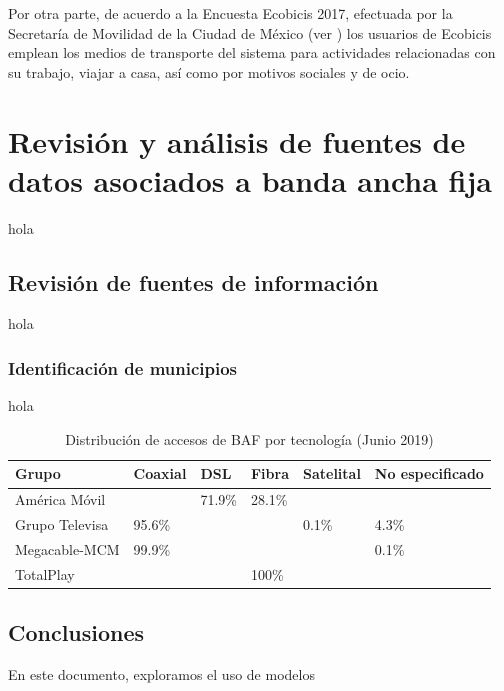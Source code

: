 \documentclass[9pt,twocolumn,twoside]{ilcss}
\begin{document}
Por otra parte, de acuerdo a la Encuesta Ecobicis 2017, efectuada por la Secretaría de Movilidad de la Ciudad de México (ver \cite{Ecobicis2017}) los usuarios de Ecobicis emplean los medios de transporte del sistema para actividades relacionadas con su trabajo, viajar a casa, así como por motivos sociales y de ocio.

\section{Revisión y análisis de fuentes de datos asociados a banda ancha fija}

hola

\subsection{Revisión de fuentes de información}

hola
\subsubsection{Identificación de municipios}

hola

\begin{table}[tbhp]
 \centering
	\caption{Distribución de accesos de BAF por tecnología (Junio 2019)\label{table:distribaccesosgrupos}}
	\begin{tabular}{@{}llllll@{}}
		\toprule
		Grupo & Coaxial & DSL & Fibra & Satelital & No especificado \\ \midrule
		América Móvil &  & 71.9\% & 28.1\% &  &  \\ 
		Grupo Televisa & 95.6\% &  &  & 0.1\% & 4.3\% \\ 
		Megacable-MCM & 99.9\% &  &  &  & 0.1\% \\ 
		TotalPlay &  &  & 100\% &  &  \\ \bottomrule
	\end{tabular}
\end{table}


\subsection{Conclusiones}

En este documento, exploramos el uso de modelos 

\end{document}
